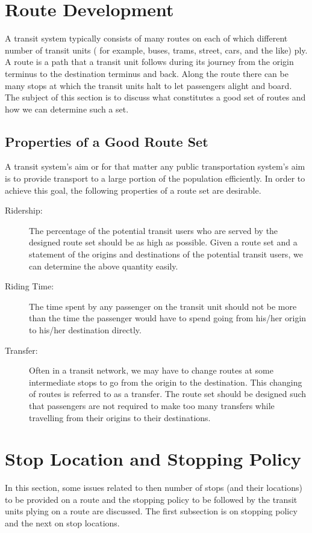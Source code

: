 \section{Route Development}
A transit system typically consists of many routes on each of which different number of transit units ( for example, buses, trams, street, cars, and the like) ply. A route is a path that a transit unit follows during its journey from the origin terminus to the destination terminus and back. Along the route there can be many stops at which the transit units halt to let passengers alight and board. The subject of this section is to discuss what constitutes a good set of routes and how we can determine such a set.
\subsection{Properties of a Good Route Set}
A transit system's aim or for that matter any public transportation system's aim is to provide transport to a large portion of the population efficiently. In order to achieve this goal, the following properties of a route set are desirable.
\begin{description}
	\item [Ridership:] The percentage of the potential transit users who are served by the designed route set should be as high as possible. Given a route set and a statement of the origins and destinations of the potential transit users, we can determine the above quantity easily.
	\item [Riding Time:] The time spent by any passenger on the transit unit should not be more than the time the passenger would have to spend going from his/her origin to his/her destination directly.
	\item [Transfer:] Often in a transit network, we may have to change routes at some intermediate stops to go from the origin to the destination. This changing of routes is referred to as a transfer. The route set should be designed such that passengers are not required to make too many transfers while travelling from their origins to their destinations.
\end{description}
%
\section{Stop Location and Stopping Policy}
In this section, some issues related to then number of stops (and their locations) to be provided on a route and the stopping policy to be followed by the transit units plying on a route are discussed. The first subsection is on stopping policy and the next on stop locations.
